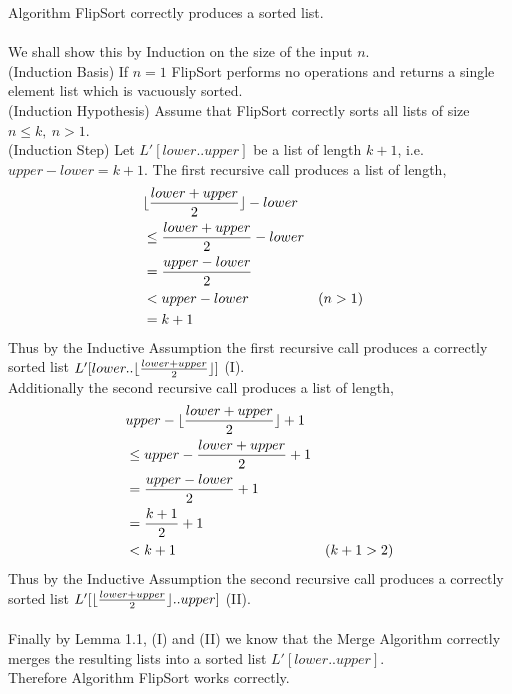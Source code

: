 \documentclass[12pt]{article}
\newenvironment{lemma}[2][Lemma]{\begin{trivlist}
\item[\hskip \labelsep {\bfseries #1}\hskip \labelsep {\bfseries #2.}]}{\end{trivlist}}
\newenvironment{question}[2][Question]{\begin{trivlist}
\item[\hskip \labelsep {\bfseries #1}\hskip \labelsep {\bfseries #2.}]}{\end{trivlist}}
\DeclarePairedDelimiter{\floor}{\lfloor}{\rfloor}
\begin{document}
\begin{question}{1 (a)}
  \begin{lemma}{1.2} Algorithm FlipSort correctly produces a sorted list.
    \leavevmode \\ \\
    We shall show this by Induction on the size of the input $n$.\\
    (Induction Basis) If $n=1$ FlipSort performs no operations and returns a
    single element list which is vacuously sorted.\\
    (Induction Hypothesis) Assume that FlipSort correctly sorts all lists of size $n \leq k,\ n > 1$. \\
    (Induction Step) Let $L'[lower..upper]$ be a list of length $k + 1$, i.e.
    $upper - lower = k + 1$.  The first recursive call produces a list of length,
    \begin{align*}
       & \floor{\frac{lower + upper}{2}} - lower &\\
       & \leq \frac{lower + upper}{2} - lower & \\
       & = \frac{upper-lower}{2} & \\
       & < upper - lower & (n > 1) & \\
       & = k + 1 &
    \end{align*}
    Thus by the Inductive Assumption the first recursive call produces a correctly
    sorted list $L'[lower..\floor{\frac{lower + upper}{2}}]$ (I).\\
    Additionally the second recursive call produces a list of length,
    \begin{align*}
      & upper  - \floor{\frac{lower + upper}{2}} + 1 & \\
      & \leq upper - \frac{lower + upper}{2} + 1 & \\
      & = \frac{upper - lower}{2} + 1 &\\
      & = \frac{k + 1}{2} + 1 &\\
      & < k + 1 & (k + 1 > 2)
    \end{align*}
    Thus by the Inductive Assumption the second recursive call produces a correctly
    sorted list $L'[\floor{\frac{lower + upper}{2}}..upper]$ (II). \\ \\
    Finally by Lemma 1.1, (I) and (II) we know that the Merge Algorithm correctly
    merges the resulting lists into a sorted list $L'[lower..upper]$.\\
    Therefore Algorithm FlipSort works correctly.
  \end{lemma}


\end{question}
\end{document}

